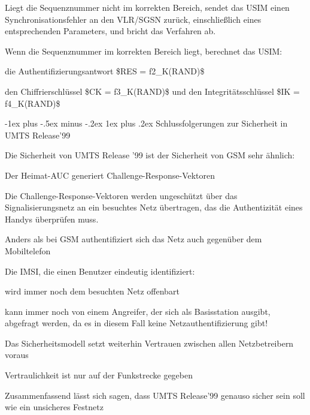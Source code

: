 \documentclass[a4paper]{article}
\makeatletter
\renewcommand{\subsubsection}{\@startsection{subsubsection}{3}{0mm}%
 {-1ex plus -.5ex minus -.2ex}%
 {1ex plus .2ex}%
 {\normalfont\small\bfseries}}
\makeatother
\begin{document}
\begin{multicols}{3}
\begin{itemize*}
\begin{itemize*}
                  \begin{itemize*} \item Liegt die Sequenznummer nicht im korrekten Bereich, sendet das USIM einen Synchronisationsfehler an den VLR/SGSN zurück, einschließlich eines entsprechenden Parameters, und bricht das Verfahren ab. \end{itemize*}
                  \item Wenn die Sequenznummer im korrekten Bereich liegt, berechnet das USIM:
                  \begin{itemize*} \item die Authentifizierungsantwort \$RES = f2\_K(RAND)\$ \item den Chiffrierschlüssel \$CK = f3\_K(RAND)\$ und den Integritätsschlüssel \$IK = f4\_K(RAND)\$ \end{itemize*}
            \end{itemize*}
      \end{itemize*}


      \subsubsection{Schlussfolgerungen zur Sicherheit in UMTS
            Release'99}

      \begin{itemize*}
            \item Die Sicherheit von UMTS Release '99 ist der Sicherheit von GSM sehr
            ähnlich:
            \begin{itemize*}
                  \item Der Heimat-AUC generiert Challenge-Response-Vektoren
                  \item Die Challenge-Response-Vektoren werden ungeschützt über das Signalisierungsnetz an ein besuchtes Netz übertragen, das die Authentizität eines Handys überprüfen muss.
                  \item Anders als bei GSM authentifiziert sich das Netz auch gegenüber dem Mobiltelefon
                  \item Die IMSI, die einen Benutzer eindeutig identifiziert:
                  \begin{itemize*} \item wird immer noch dem besuchten Netz offenbart \item kann immer noch von einem Angreifer, der sich als Basisstation ausgibt, abgefragt werden, da es in diesem Fall keine Netzauthentifizierung gibt! \end{itemize*}
                  \item Das Sicherheitsmodell setzt weiterhin Vertrauen zwischen allen Netzbetreibern voraus
                  \item Vertraulichkeit ist nur auf der Funkstrecke gegeben
            \end{itemize*}
            \item Zusammenfassend lässt sich sagen, dass UMTS Release'99 genauso sicher
            sein soll wie ein unsicheres Festnetz
      \end{itemize*}



\end{multicols}
\end{document}
